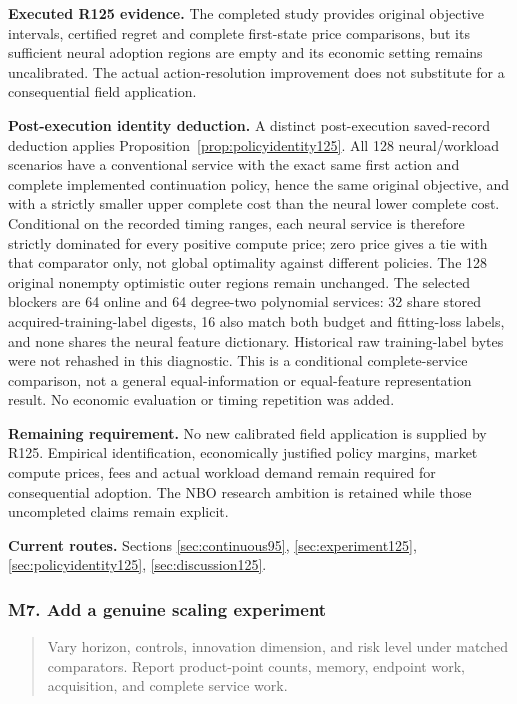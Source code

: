 \noindent\textbf{Executed R125 evidence.} The completed study provides original objective intervals, certified regret and complete first-state price comparisons, but its sufficient neural adoption regions are empty and its economic setting remains uncalibrated. The actual action-resolution improvement does not substitute for a consequential field application.

\noindent\textbf{Post-execution identity deduction.} A distinct post-execution saved-record deduction applies Proposition~\ref{prop:policyidentity125}. All 128 neural/workload scenarios have a conventional service with the exact same first action and complete implemented continuation policy, hence the same original objective, and with a strictly smaller upper complete cost than the neural lower complete cost. Conditional on the recorded timing ranges, each neural service is therefore strictly dominated for every positive compute price; zero price gives a tie with that comparator only, not global optimality against different policies. The 128 original nonempty optimistic outer regions remain unchanged. The selected blockers are 64 online and 64 degree-two polynomial services: 32 share stored acquired-training-label digests, 16 also match both budget and fitting-loss labels, and none shares the neural feature dictionary. Historical raw training-label bytes were not rehashed in this diagnostic. This is a conditional complete-service comparison, not a general equal-information or equal-feature representation result. No economic evaluation or timing repetition was added.

\noindent\textbf{Remaining requirement.} No new calibrated field application is supplied by R125. Empirical identification, economically justified policy margins, market compute prices, fees and actual workload demand remain required for consequential adoption. The NBO research ambition is retained while those uncompleted claims remain explicit.

\noindent\textbf{Current routes.} Sections \ref{sec:continuous95}, \ref{sec:experiment125}, \ref{sec:policyidentity125}, \ref{sec:discussion125}.

\subsubsection{M7. Add a genuine scaling experiment}

\begin{quote}\small
Vary horizon, controls, innovation dimension, and risk level under matched comparators. Report product-point counts, memory, endpoint work, acquisition, and complete service work.
\end{quote}

